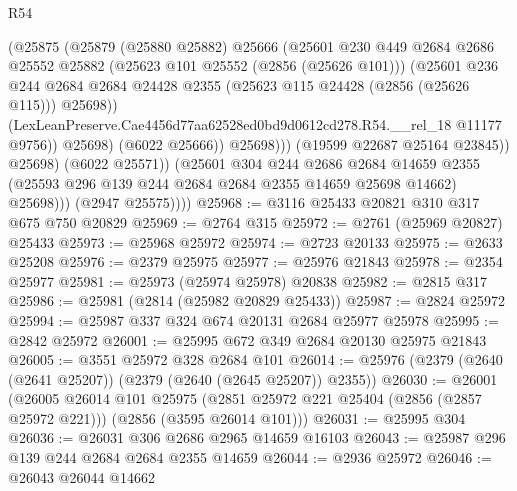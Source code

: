 \begin{lexlean}{R54}
\begin{coremodule}
                            (@25875
                              (@25879
                                (@25880 @25882)
                                @25666
                                (@25601
                                  @230
                                  @449
                                  @2684
                                  @2686
                                  @25552
                                  @25882
                                  (@25623 @101 @25552 (@2856 (@25626 @101)))
                                  (@25601
                                    @236
                                    @244
                                    @2684
                                    @2684
                                    @24428
                                    @2355
                                    (@25623 @115 @24428 (@2856 (@25626 @115)))
                                    @25698))
                                (LexLeanPreserve.Cae4456d77aa62528ed0bd9d0612cd278.R54.__rel_18
                                  @11177
                                  @9756))
                              @25698)
                            (@6022 @25666))
                          @25698)))
                    (@19599 @22687 @25164 @23845))
                  @25698)
                (@6022 @25571))
              (@25601
                @304
                @244
                @2686
                @2684
                @14659
                @2355
                (@25593 @296 @139 @244 @2684 @2684 @2355 @14659 @25698 @14662)
                @25698)))
          (@2947 @25575))))
@25968 := @3116 @25433 @20821 @310 @317 @675 @750 @20829
@25969 := @2764 @315
@25972 := @2761 (@25969 @20827) @25433
@25973 := @25968 @25972
@25974 := @2723 @20133
@25975 := @2633 @25208
@25976 := @2379 @25975
@25977 := @25976 @21843
@25978 := @2354 @25977
@25981 := @25973 (@25974 @25978) @20838
@25982 := @2815 @317
@25986 := @25981 (@2814 (@25982 @20829 @25433))
@25987 := @2824 @25972
@25994 := @25987 @337 @324 @674 @20131 @2684 @25977 @25978
@25995 := @2842 @25972
@26001 := @25995 @672 @349 @2684 @20130 @25975 @21843
@26005 := @3551 @25972 @328 @2684 @101
@26014 := @25976 (@2379 (@2640 (@2641 @25207)) (@2379 (@2640 (@2645 @25207)) @2355))
@26030 := @26001
    (@26005
      @26014
      @101
      @25975
      (@2851 @25972 @221 @25404 (@2856 (@2857 @25972 @221)))
      (@2856 (@3595 @26014 @101)))
@26031 := @25995 @304
@26036 := @26031 @306 @2686 @2965 @14659 @16103
@26043 := @25987 @296 @139 @244 @2684 @2684 @2355 @14659
@26044 := @2936 @25972
@26046 := @26043 @26044 @14662

\end{coremodule}
\end{lexlean}
